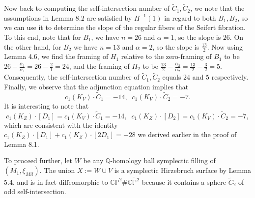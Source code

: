 \documentclass[11pt]{amsart}
\theoremstyle{plain}
\numberwithin{theorem}{section}
\theoremstyle{definition}
\newcommand{\C}{{\mathbb C}}
\newcommand{\Q}{{\mathbb Q}}
\renewcommand{\P}{{\mathbb P}}
\begin{document}
Now back to computing the self-intersection number of $\tilde{C}_1,\tilde{C}_2$, we note that the
assumptions in Lemma 8.2 are satisfied by $H^{-1}(1)$ in regard to both $B_1,B_2$, so we can use 
it to determine the slope of the regular fibers of the Seifert fibration. To this end, note that for $B_1$,
we have $n=26$ and $\alpha=1$, so the slope is $26$. On the other hand, for $B_2$ we have
$n=13$ and $\alpha=2$, so the slope is $\frac{13}{2}$. Now using Lemma 4.6, we find the framing of
$H_1$ relative to the zero-framing of $B_1$ to be 
$26-\frac{\bar{\alpha}_1}{\alpha_1}=26-\frac{2}{1}=24$, and the framing of $H_2$ to be 
$\frac{13}{2}-\frac{\bar{\alpha}_2}{\alpha_2}=\frac{13}{2}-\frac{3}{2}=5$. Consequently, 
the self-intersection number of $\tilde{C}_1,\tilde{C}_2$ equals $24$ and $5$ respectively. 
Finally, we observe that the adjunction equation implies that
$$
c_1(K_V)\cdot \tilde{C}_1=-14, \;\; c_1(K_V)\cdot \tilde{C}_2=-7.
$$
It is interesting to note that 
$$
c_1(K_Z)\cdot [D_1]=c_1(K_V)\cdot \tilde{C}_1=-14, \;\; 
c_1(K_Z)\cdot [D_2]=c_1(K_V)\cdot \tilde{C}_2=-7,
$$
which are consistent with the identity $c_1(K_Z)\cdot [D_1]+c_1(K_Z)\cdot [2D_1]=-28$ we derived earlier in the proof of Lemma 8.1.

To proceed further, let $W$ be any  $\Q$-homology ball symplectic filling of $(M_1,\xi_{Mil})$. The union 
$X:=W\cup V$ is a symplectic Hirzebruch surface by Lemma 5.4, and is in fact diffeomorphic to
$\C\P^2\#\overline{\C\P^2}$ because it contains a sphere $\tilde{C}_2$ of odd self-intersection. 
\end{document}
